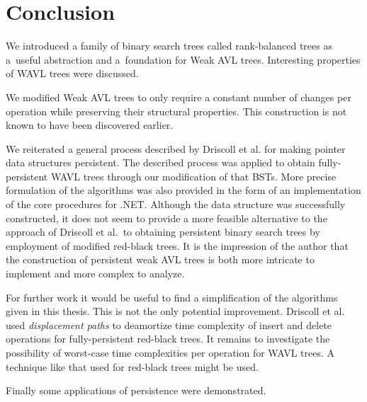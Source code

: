 \chapter*{Conclusion}

We introduced a family of binary search trees called rank-balanced trees as a~useful abstraction and a~foundation for Weak AVL trees. Interesting properties of WAVL trees were discussed.

We modified Weak AVL trees to only require a constant number of changes per operation while preserving their structural properties. 
This construction is not known to have been discovered earlier.

We reiterated a general process described by Driscoll et al. \cite{persistence-DSST} for making pointer data structures persistent. 
The described process was applied to obtain fully-persistent WAVL trees through our modification of that BSTs. 
More precise formulation of the algorithms was also provided in the form of an implementation of the core procedures for .NET. 
Although the data structure was successfully constructed, 
it does not seem to provide a more feasible alternative to the approach of Driscoll et al.~to obtaining persistent binary search trees by employment of modified red-black trees. 
It is the impression of the author that the construction of persistent weak AVL trees is both more intricate to implement and more complex to analyze.

For further work it would be useful to find a simplification of the algorithms given in this thesis. This is not the only potential improvement.
Driscoll et al. used \textit{displacement paths} to deamortize time complexity of insert and delete operations for fully-persistent red-black trees. 
It remains to investigate the possibility of worst-case time complexities per operation for WAVL trees. A technique like that used for red-black trees might be used.


Finally some applications of persistence were demonstrated.
